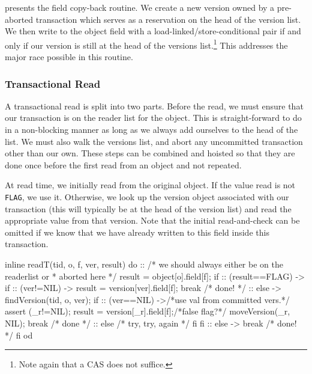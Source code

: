 \documentclass{csa-sig-alternate}
\newenvironment{inlinecode}%
  {\par\linespread{0.9}\footnotesize\samepage%
\verbatim}%
  {\endverbatim}
\newcommand{\FLAG}{\texttt{FLAG}\xspace}
\begin{document}
 presents the field copy-back routine.  We create a
new version owned by a pre-aborted transaction which serves as a
reservation on the head of the version list.  We then write to the
object field with a load-linked/store-conditional pair if and only if
our version is still at the head of the versions list.\footnote{Note
  again that a CAS does not suffice.}  This addresses
the major race possible in this routine.

\subsubsection{Transactional Read}
A transactional read is split into two parts.  Before the read, we
must ensure that our transaction is on the reader list for the
object.  This is straight-forward to do in a non-blocking manner as
long as we always add ourselves to the head of the list.  We must also
walk the versions list, and abort any uncommitted transaction other
than our own.  These steps can be combined and hoisted so that they
are done once before the first read from an object and not repeated.

At read time, we initially read from the original object.  If the
value read is not \FLAG, we use it.  Otherwise, we look up the version
object associated with our transaction (this will typically be at the
head of the version list) and read the appropriate value from that
version.  Note that the initial read-and-check can be omitted if we
know that we have already written to this field inside this transaction.
\begin{inlinecode}
inline readT(tid, o, f, ver, result) {
  do
  ::
     /* we should always either be on the readerlist or
      * aborted here */
     result = object[o].field[f];
     if
     :: (result==FLAG) ->
        if
        :: (ver!=NIL) ->
           result = version[ver].field[f];
           break /* done! */
        :: else ->
           findVersion(tid, o, ver);
           if
           :: (ver==NIL) ->/*use val from committed vers.*/
              assert (_r!=NIL);
              result = version[_r].field[f];/*false flag?*/
              moveVersion(_r, NIL);
              break /* done */
           :: else /* try, try, again */
           fi
        fi
     :: else -> break /* done! */
     fi
  od
}
\end{inlinecode}
\end{document}
